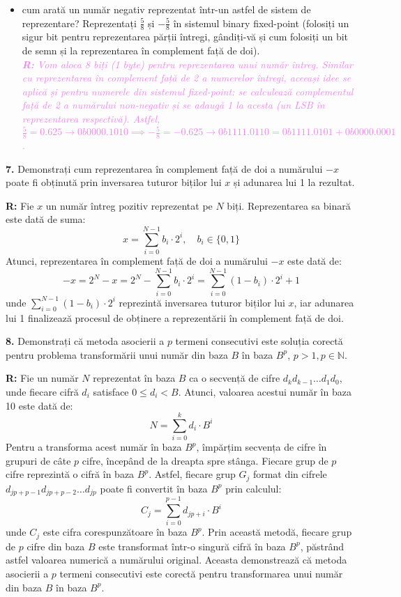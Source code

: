 \documentclass[a4paper]{article}
\newcommand{\hl}[1]{\textcolor{violet}{\textit{#1}}}
\newenvironment{definition}[1]
    {\begin{definitionbox}[frametitle={#1}]}
    {\end{definitionbox}}
\begin{document}
\begin{itemize}
    \item cum arată un număr negativ reprezentat într-un astfel de sistem de reprezentare? Reprezentați $\frac{5}{8}$ și $-\frac{5}{8}$ în sistemul binary fixed-point (folosiți un sigur bit pentru reprezentarea părții întregi, gândiți-vă și cum folosiți un bit de semn și la  reprezentarea în complement față de doi). \\ \hl{\textbf{R:} Vom aloca 8 biți \textit{(1 byte)} pentru reprezentarea unui număr întreg. Similar cu reprezentarea în complement față de 2 a numerelor întregi, aceeași idee se aplică și pentru numerele din sistemul fixed-point: se calculează complementul față de 2 a numărului non-negativ și se adaugă 1 la acesta (un LSB în reprezentarea respectivă). Astfel, $\frac{5}{8} = 0.625 \rightarrow 0b0000.1010 \implies -\frac{5}{8} = -0.625 \rightarrow 0b1111.0110 = 0b1111.0101 + 0b0000.0001$.}
\end{itemize}
\vspace{0.75cm}

\textbf{7.} Demonstrați cum reprezentarea în complement față de doi a numărului $-x$ poate fi obținută prin inversarea tuturor biților lui $x$ și adunarea lui 1 la rezultat.
\begin{definition}{}
\textbf{R:} Fie $x$ un număr întreg pozitiv reprezentat pe $N$ biți. Reprezentarea sa binară este dată de suma:
\[
x = \sum_{i=0}^{N-1} b_i \cdot 2^i, \quad b_i \in \{0, 1\}
\]
Atunci, reprezentarea în complement față de doi a numărului $-x$ este dată de:
\[-x = 2^N - x = 2^N - \sum_{i=0}^{N-1} b_i \cdot 2^i = \sum_{i=0}^{N-1} (1 - b_i) \cdot 2^i + 1
\]
unde $\sum_{i=0}^{N-1} (1 - b_i) \cdot 2^i$ reprezintă inversarea tuturor biților lui $x$, iar adunarea lui 1 finalizează procesul de obținere a reprezentării în complement față de doi.
\end{definition}
\newpage

\textbf{8.} Demonstrați că metoda asocierii a $p$ termeni consecutivi este soluția corectă pentru problema transformării unui număr din baza $B$ în baza $B^p$, $p > 1, p \in \mathbb{N}$.
\begin{definition}{}
\textbf{R:} Fie un număr $N$ reprezentat în baza $B$ ca o secvență de cifre $d_k d_{k-1} \dots d_1 d_0$, unde fiecare cifră $d_i$ satisface $0 \leq d_i < B$. Atunci, valoarea acestui număr în baza 10 este dată de:
\[N = \sum_{i=0}^{k} d_i \cdot B^i\]
Pentru a transforma acest număr în baza $B^p$, împărțim secvența de cifre în grupuri de câte $p$ cifre, începând de la dreapta spre stânga. Fiecare grup de $p$ cifre reprezintă o cifră în baza $B^p$. Astfel, fiecare grup $G_j$ format din cifrele $d_{jp + p - 1} d_{jp + p - 2} \dots d_{jp}$ poate fi convertit în baza $B^p$ prin calculul:
\[C_j = \sum_{i=0}^{p-1} d_{jp + i} \cdot B^i\]
unde $C_j$ este cifra corespunzătoare în baza $B^p$. Prin această metodă, fiecare grup de $p$ cifre din baza $B$ este transformat într-o singură cifră în baza $B^p$, păstrând astfel valoarea numerică a numărului original. Aceasta demonstrează că metoda asocierii a $p$ termeni consecutivi este corectă pentru transformarea unui număr din baza $B$ în baza $B^p$.
\end{definition}
\end{document}
